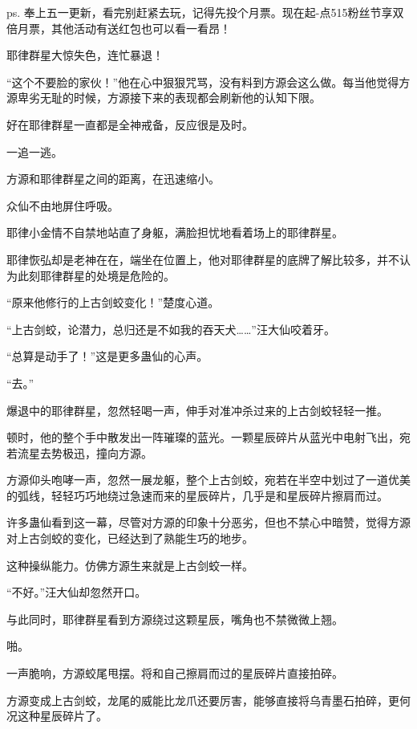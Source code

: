 
\begin{this_body}

ps. 奉上五一更新，看完别赶紧去玩，记得先投个月票。现在起-点515粉丝节享双倍月票，其他活动有送红包也可以看一看昂！

耶律群星大惊失色，连忙暴退！

“这个不要脸的家伙！”他在心中狠狠咒骂，没有料到方源会这么做。每当他觉得方源卑劣无耻的时候，方源接下来的表现都会刷新他的认知下限。

好在耶律群星一直都是全神戒备，反应很是及时。

一追一逃。

方源和耶律群星之间的距离，在迅速缩小。

众仙不由地屏住呼吸。

耶律小金情不自禁地站直了身躯，满脸担忧地看着场上的耶律群星。

耶律恢弘却是老神在在，端坐在位置上，他对耶律群星的底牌了解比较多，并不认为此刻耶律群星的处境是危险的。

“原来他修行的上古剑蛟变化！”楚度心道。

“上古剑蛟，论潜力，总归还是不如我的吞天犬……”汪大仙咬着牙。

“总算是动手了！”这是更多蛊仙的心声。

“去。”

爆退中的耶律群星，忽然轻喝一声，伸手对准冲杀过来的上古剑蛟轻轻一推。

顿时，他的整个手中散发出一阵璀璨的蓝光。一颗星辰碎片从蓝光中电射飞出，宛若流星去势极迅，撞向方源。

方源仰头咆哮一声，忽然一展龙躯，整个上古剑蛟，宛若在半空中划过了一道优美的弧线，轻轻巧巧地绕过急速而来的星辰碎片，几乎是和星辰碎片擦肩而过。

许多蛊仙看到这一幕，尽管对方源的印象十分恶劣，但也不禁心中暗赞，觉得方源对上古剑蛟的变化，已经达到了熟能生巧的地步。

这种操纵能力。仿佛方源生来就是上古剑蛟一样。

“不好。”汪大仙却忽然开口。

与此同时，耶律群星看到方源绕过这颗星辰，嘴角也不禁微微上翘。

啪。

一声脆响，方源蛟尾甩摆。将和自己擦肩而过的星辰碎片直接拍碎。

方源变成上古剑蛟，龙尾的威能比龙爪还要厉害，能够直接将乌青墨石拍碎，更何况这种星辰碎片了。


\end{this_body}
